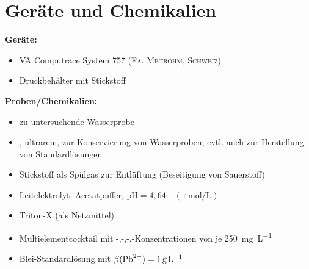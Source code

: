 \newpage
\section{Geräte und Chemikalien}
\label{sec:geraete}

\textbf{Geräte:}
\begin{itemize}
	\item VA Computrace System 757 (\textsc{Fa. Metrohm, Schweiz})
	\item Druckbehälter mit Stickstoff
	
\end{itemize}

\vspace*{5mm}

\textbf{Proben/Chemikalien:}
\begin{itemize}
	\item zu untersuchende Wasserprobe
	\item {}, ultrarein, zur Konservierung von Wasserproben, evtl. auch zur Herstellung von Standardlösungen
	\item Stickstoff als Spülgas zur Entlüftung (Beseitigung von Sauerstoff)
	\item Leitelektrolyt: Acetatpuffer, pH$=4,64 \quad \left(\SI{1}{\mol\per\liter}\right)$
	\item Triton-X (als Netzmittel)
	\item Multielementcocktail mit -,-,-,-Konzentrationen von je \SI{250}{\milli \gram\per \liter}
	\item Blei-Standardlösung mit $\beta(\ce{Pb^{2+}})=\SI{1}{\gram\per\liter}$
\end{itemize}






